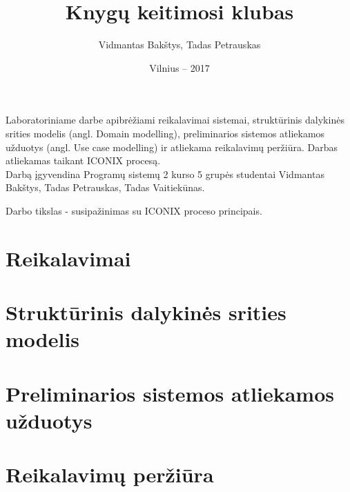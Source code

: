 \documentclass{VUMIFPSkursinis}
\title{Knygų keitimosi klubas}
\author{Vidmantas Bakštys, Tadas Petrauskas}
\date{Vilnius – 2017}
\begin{document}
\maketitle

Laboratoriniame darbe apibrėžiami reikalavimai sistemai, struktūrinis dalykinės srities modelis (angl. Domain modelling), preliminarios sistemos atliekamos užduotys (angl. Use case modelling) ir atliekama reikalavimų peržiūra. Darbas atliekamas taikant ICONIX procesą.\\
Darbą įgyvendina Programų sistemų 2 kurso 5 grupės studentai Vidmantas Bakštys, Tadas Petrauskas, Tadas Vaitiekūnas.

\setcounter{tocdepth}{2}

\tableofcontents

﻿Darbo tikslas - susipažinimas su ICONIX proceso principais. 


\section{Reikalavimai}

\section{Struktūrinis dalykinės srities modelis}

\section{Preliminarios sistemos atliekamos užduotys}

\section{Reikalavimų peržiūra}
\end{document}
